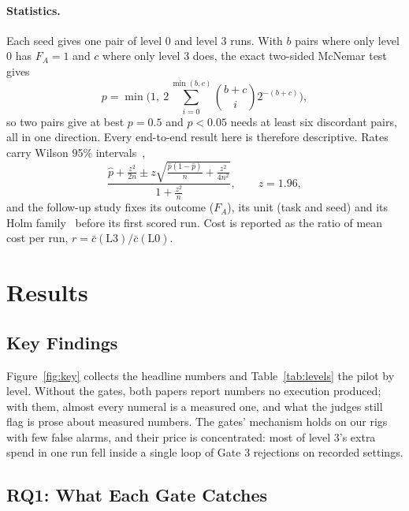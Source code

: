 \documentclass[sigconf,anonymous]{aamas}
\begin{document}
\paragraph{Statistics.}
Each seed gives one pair of level 0 and level 3 runs.
With $b$ pairs where only level 0 has $F_A = 1$ and $c$ where only level 3 does, the exact two-sided McNemar test~\cite{mcnemar1947note} gives
\begin{equation}
\label{eq:mcnemar}
p = \min\Big(1,\ 2 \sum_{i=0}^{\min(b,c)} \binom{b+c}{i} 2^{-(b+c)}\Big),
\end{equation}
so two pairs give at best $p = 0.5$ and $p < 0.05$ needs at least six discordant pairs, all in one direction.
Every end-to-end result here is therefore descriptive.
Rates carry Wilson 95\% intervals~\cite{wilson1927probable},
\begin{equation}
\label{eq:wilson}
\frac{\hat p + \frac{z^2}{2n} \pm z \sqrt{\frac{\hat p (1 - \hat p)}{n} + \frac{z^2}{4n^2}}}{1 + \frac{z^2}{n}}, \qquad z = 1.96,
\end{equation}
and the follow-up study fixes its outcome ($F_A$), its unit (task and seed) and its Holm family~\cite{holm1979simple} before its first scored run.
Cost is reported as the ratio of mean cost per run, $r = \bar c(\mathrm{L3}) / \bar c(\mathrm{L0})$.

\section{Results}
\label{sec:results}

\subsection{Key Findings}

Figure~\ref{fig:key} collects the headline numbers and Table~\ref{tab:levels} the pilot by level.
Without the gates, both papers report numbers no execution produced; with them, almost every numeral is a measured one, and what the judges still flag is prose about measured numbers.
The gates' mechanism holds on our rigs with few false alarms, and their price is concentrated: most of level 3's extra spend in one run fell inside a single loop of Gate 3 rejections on recorded settings.

\subsection{RQ1: What Each Gate Catches}
\label{sec:mech}
\end{document}
